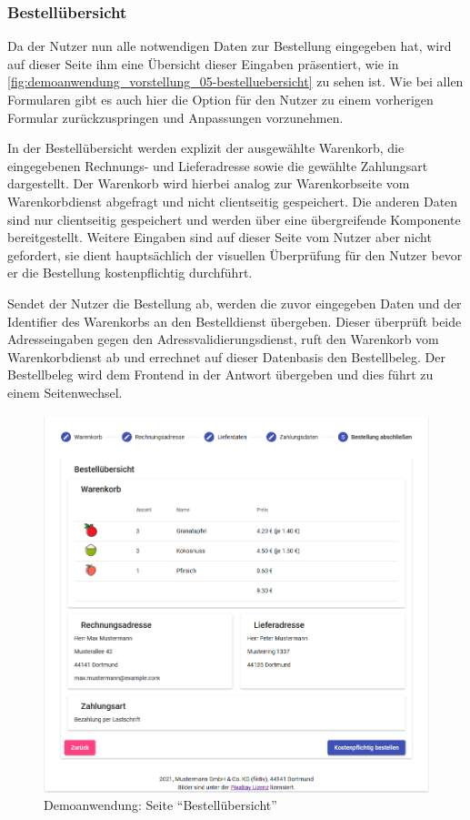 \subsubsection{Bestellübersicht}

Da der Nutzer nun alle notwendigen Daten zur Bestellung eingegeben hat, wird auf dieser Seite ihm eine Übersicht dieser Eingaben präsentiert, wie in \autoref{fig:demoanwendung_vorstellung_05-bestelluebersicht} zu sehen ist. Wie bei allen Formularen gibt es auch hier die Option für den Nutzer zu einem vorherigen Formular zurückzuspringen und Anpassungen vorzunehmen.

In der Bestellübersicht werden explizit der ausgewählte Warenkorb, die eingegebenen Rechnungs- und Lieferadresse sowie die gewählte Zahlungsart dargestellt. Der Warenkorb wird hierbei analog zur Warenkorbseite vom Warenkorbdienst abgefragt und nicht clientseitig gespeichert. Die anderen Daten sind nur clientseitig gespeichert und werden über eine übergreifende Komponente bereitgestellt. Weitere Eingaben sind auf dieser Seite vom Nutzer aber nicht gefordert, sie dient hauptsächlich der visuellen Überprüfung für den Nutzer bevor er die Bestellung kostenpflichtig durchführt.

Sendet der Nutzer die Bestellung ab, werden die zuvor eingegeben Daten und der Identifier des Warenkorbs an den Bestelldienst übergeben. Dieser überprüft beide Adresseingaben gegen den Adressvalidierungsdienst, ruft den Warenkorb vom Warenkorbdienst ab und errechnet auf dieser Datenbasis den Bestellbeleg. Der Bestellbeleg wird dem Frontend in der Antwort übergeben und dies führt zu einem Seitenwechsel.

\begin{figure}[H]
	\centering
	\includegraphics[width=0.65\linewidth]{img/04_erstellung-poc/demoanwendung_vorstellung_05-bestelluebersicht.png}
	\caption{Demoanwendung: Seite \enquote{Bestellübersicht}}
	\label{fig:demoanwendung_vorstellung_05-bestelluebersicht}
\end{figure}

